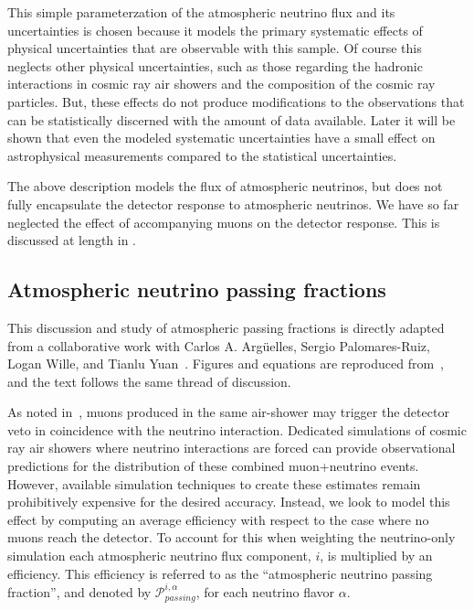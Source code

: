 This simple parameterzation of the atmospheric neutrino flux and its uncertainties is chosen because it models the primary systematic effects of physical uncertainties that are observable with this sample.
Of course this neglects other physical uncertainties, such as those regarding the hadronic interactions in cosmic ray air showers and the composition of the cosmic ray particles.
But, these effects do not produce modifications to the observations that can be statistically discerned with the amount of data available.
Later it will be shown that even the modeled systematic uncertainties have a small effect on astrophysical measurements compared to the statistical uncertainties.

The above description models the flux of atmospheric neutrinos, but does not fully encapsulate the detector response to atmospheric neutrinos.
We have so far neglected the effect of accompanying muons on the detector response.
This is discussed at length in .

\subsection{Atmospheric neutrino passing fractions}
\label{sec:passingfractions}
This discussion and study of atmospheric passing fractions is directly adapted from a collaborative work with Carlos A. Argüelles, Sergio Palomares-Ruiz, Logan Wille, and Tianlu Yuan~\cite{Arguelles:2018awr}.
Figures and equations are reproduced from~\cite{Arguelles:2018awr}, and the text follows the same thread of discussion.

As noted in~\cite{Schonert:2008is}, muons produced in the same air-shower may trigger the detector veto in coincidence with the neutrino interaction.
Dedicated simulations of cosmic ray air showers where neutrino interactions are forced can provide observational predictions for the distribution of these combined muon+neutrino events.
However, available simulation techniques to create these estimates remain prohibitively expensive for the desired accuracy.
Instead, we look to model this effect by computing an average efficiency with respect to the case where no muons reach the detector.
To account for this when weighting the neutrino-only simulation each atmospheric neutrino flux component, $i$, is multiplied by an efficiency.
This efficiency is referred to as the ``atmospheric neutrino passing fraction'', and denoted by $\mathcal{P}^{i,\alpha}_{passing}$, for each neutrino flavor $\alpha$.

